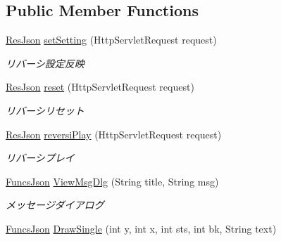 \subsection*{Public Member Functions}
\begin{DoxyCompactItemize}
\item 
\hyperlink{classjp_1_1gr_1_1java__conf_1_1yuta__yoshinaga_1_1reversi_1_1model_1_1_res_json}{Res\+Json} \hyperlink{classjp_1_1gr_1_1java__conf_1_1yuta__yoshinaga_1_1reversi_1_1controller_1_1_reversi_controller_aad191800cbf367f237bf6160037255e8}{set\+Setting} (Http\+Servlet\+Request request)
\begin{DoxyCompactList}\small\item\em リバーシ設定反映 \end{DoxyCompactList}\item 
\hyperlink{classjp_1_1gr_1_1java__conf_1_1yuta__yoshinaga_1_1reversi_1_1model_1_1_res_json}{Res\+Json} \hyperlink{classjp_1_1gr_1_1java__conf_1_1yuta__yoshinaga_1_1reversi_1_1controller_1_1_reversi_controller_a7f9b86ce3c02d16c8bb08adbcfda6957}{reset} (Http\+Servlet\+Request request)
\begin{DoxyCompactList}\small\item\em リバーシリセット \end{DoxyCompactList}\item 
\hyperlink{classjp_1_1gr_1_1java__conf_1_1yuta__yoshinaga_1_1reversi_1_1model_1_1_res_json}{Res\+Json} \hyperlink{classjp_1_1gr_1_1java__conf_1_1yuta__yoshinaga_1_1reversi_1_1controller_1_1_reversi_controller_a3c9b089c78395e6a87cf873816a2f50d}{reversi\+Play} (Http\+Servlet\+Request request)
\begin{DoxyCompactList}\small\item\em リバーシプレイ \end{DoxyCompactList}\item 
\hyperlink{classjp_1_1gr_1_1java__conf_1_1yuta__yoshinaga_1_1reversi_1_1model_1_1_funcs_json}{Funcs\+Json} \hyperlink{classjp_1_1gr_1_1java__conf_1_1yuta__yoshinaga_1_1reversi_1_1controller_1_1_reversi_controller_ac3cff78c16b0190fd744317a8c1a07d6}{View\+Msg\+Dlg} (String title, String msg)
\begin{DoxyCompactList}\small\item\em メッセージダイアログ \end{DoxyCompactList}\item 
\hyperlink{classjp_1_1gr_1_1java__conf_1_1yuta__yoshinaga_1_1reversi_1_1model_1_1_funcs_json}{Funcs\+Json} \hyperlink{classjp_1_1gr_1_1java__conf_1_1yuta__yoshinaga_1_1reversi_1_1controller_1_1_reversi_controller_a2303f5dc844932ae026ec80d6323f726}{Draw\+Single} (int y, int x, int sts, int bk, String text)

\end{DoxyCompactItemize}
